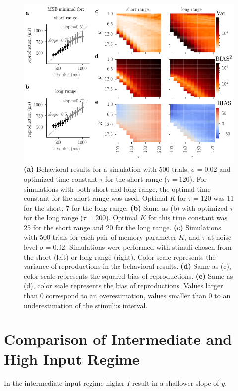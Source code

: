 \documentclass[10pt]{article}
\begin{document}
\begin{figure}[ht]
	\centering
	\includegraphics{figures/supp_othererror.pdf}
	\caption{%
	\textbf{(a)} Behavioral results for a simulation with 500 trials, $\sigma = 0.02$ and optimized time constant $\tau$ for the short range ($\tau = 120$). For simulations with both short and long range, the optimal time constant for the short range was used. Optimal $K$ for $\tau = 120$ was 11 for the short, 7 for the long range.
	\textbf{(b)} Same as (b) with optimized $\tau$ for the long range ($\tau = 200$). Optimal $K$ for this time constant was 25 for the short range and 20 for the long range. 
	\textbf{(c)}  Simulations with 500 trials for each pair of memory parameter $K$, and $\tau$ at noise level $\sigma = 0.02$. Simulations were performed with stimuli chosen from the short (left) or long range (right). Color scale represents the variance of reproductions in the behavioral results.
	\textbf{(d)} Same as (c), color scale represents the squared bias of reproductions.
	\textbf{(e)} Same as (d), color scale represents the bias of reproductions. Values larger than 0 correspond to an overestimation, values smaller than 0 to an underestimation of the stimulus interval.
	}
\label{sup:othererror}
\end{figure}

\section{Comparison of Intermediate and High Input Regime}
In the intermediate input regime higher $I$ result in a shallower slope of $y$.
\end{document}
